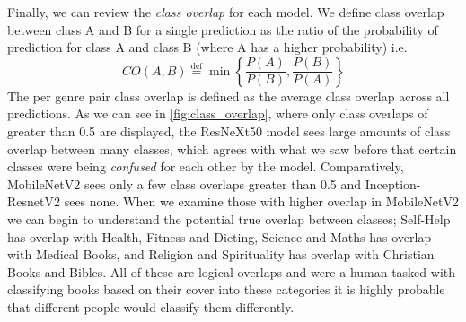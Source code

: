 \documentclass[12pt]{article}
\numberwithin{equation}{section}
\numberwithin{figure}{section}
\begin{document}
Finally, we can review the \emph{class overlap} for each model. We define class overlap between class A and B for a single prediction as the ratio of the probability of prediction for class A and class B (where A has a higher probability) i.e.
\begin{equation}
	CO(A, B) \stackrel{\mathrm{def}}{=} \min\left\{\frac{P(A)}{P(B)}, \frac{P(B)}{P(A)}\right\}
\end{equation}
The per genre pair class overlap is defined as the average class overlap across all predictions. As we can see in \cref{fig:class_overlap}, where only class overlaps of greater than 0.5 are displayed, the ResNeXt50 model sees large amounts of class overlap between many classes, which agrees with what we saw before that certain classes were being \emph{confused} for each other by the model. Comparatively, MobileNetV2 sees only a few class overlaps greater than 0.5 and Inception-ResnetV2 sees none. When we examine those with higher overlap in MobileNetV2 we can begin to understand the potential true overlap between classes; Self-Help has overlap with Health, Fitness and Dieting, Science and Maths has overlap with Medical Books, and Religion and Spirituality has overlap with Christian Books and Bibles. All of these are logical overlaps and were a human tasked with classifying books based on their cover into these categories it is highly probable that different people would classify them differently. 
\end{document}

